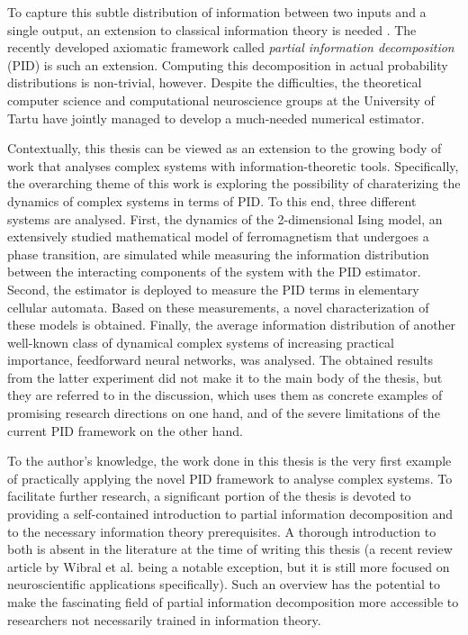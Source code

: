 \documentclass[12pt]{article}
\begin{document}
To capture this subtle distribution of information between two inputs and a single output, an extension to classical information theory is needed \cite{williams-beer}. The recently developed axiomatic framework called \textit{partial information decomposition} (PID) \cite{bertschinger} is such an extension. Computing this decomposition in actual probability distributions is non-trivial, however. Despite the difficulties, the theoretical computer science and computational neuroscience groups at the University of Tartu have jointly managed to develop a much-needed numerical estimator. 

Contextually, this thesis can be viewed as an extension to the growing body of work that analyses complex systems with information-theoretic tools. Specifically, the overarching theme of this work is exploring the possibility of charaterizing the dynamics of complex systems in terms of PID. To this end, three different systems are analysed. First, the dynamics of the 2-dimensional Ising model, an extensively studied mathematical model of ferromagnetism that undergoes a phase transition, are simulated while measuring the information distribution between the interacting components of the system with the PID estimator. Second, the estimator is deployed to measure the PID terms in elementary cellular automata. Based on these measurements, a novel characterization of these models is obtained. Finally, the average information distribution of another well-known class of dynamical complex systems of increasing practical importance, feedforward neural networks, was analysed. The obtained results from the latter experiment did not make it to the main body of the thesis, but they are referred to in the discussion, which uses them as concrete examples of promising research directions on one hand, and of the severe limitations of the current PID framework on the other hand. 

To the author's knowledge, the work done in this thesis is the very first example of practically applying the novel PID framework to analyse complex systems. To facilitate further research, a significant portion of the thesis is devoted to providing a self-contained introduction to partial information decomposition and to the necessary information theory prerequisites. A thorough introduction to both is absent in the literature at the time of writing this thesis (a recent review article by Wibral et al.  \cite{bits-from-brains} being a notable exception, but it is still more focused on neuroscientific applications specifically). Such an overview has the potential to make the fascinating field of partial information decomposition more accessible to researchers not necessarily trained in information theory.  
\end{document}
